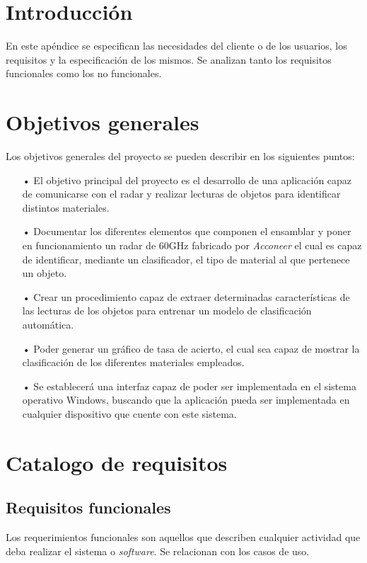 
\section{Introducción}

En este apéndice se especifican las necesidades del cliente o de los usuarios, los requisitos y la especificación de los mismos. Se analizan tanto los requisitos funcionales como los no funcionales.

\section{Objetivos generales}

Los objetivos generales del proyecto se pueden describir en los siguientes puntos:
\begin{itemize}
\item[•] El objetivo principal del proyecto es el desarrollo de una aplicación capaz de comunicarse con el radar y realizar lecturas de objetos para identificar distintos materiales.

\item[•] Documentar los diferentes elementos que componen el ensamblar y poner en funcionamiento un radar de 60GHz fabricado por \textit{Acconeer} el cual es capaz de identificar, mediante un clasificador, el tipo de material al que pertenece un objeto.

\item[•] Crear un procedimiento capaz de extraer determinadas características de las lecturas de los objetos para entrenar un modelo de clasificación automática.

\item[•] Poder generar un gráfico de tasa de acierto, el cual sea capaz de mostrar la clasificación de los diferentes materiales empleados.

\item[•]Se establecerá una interfaz capaz de poder ser implementada en el sistema operativo Windows, buscando que la aplicación pueda ser implementada en cualquier dispositivo que cuente con este sistema.
\end{itemize}

\section{Catalogo de requisitos}
\subsection{Requisitos funcionales}
Los requerimientos funcionales son aquellos que describen cualquier actividad que deba realizar el sistema o \textit{software}. Se relacionan con los casos de uso.

